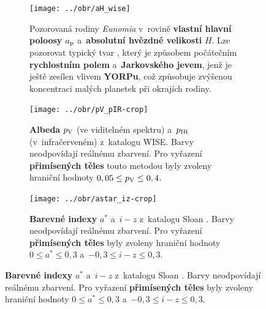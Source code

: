 \documentclass{beamer}
\newlength{\vyska}
\newlength{\vyskaB}
\newlength{\main}
\begin{document}
\begin{frame}
\begin{columns}[t]
\begin{column}{\main}
\begin{tcolorbox}[title=Výsledky\phantom{Úy},height=\vyskaB]
\begin{figure}[!htb]
\begin{subfigure}[b]{0.3\textwidth}
\label{fig:ae_ai_wise}
		\end{subfigure}
		\begin{subfigure}[b]{0.26\textwidth}
			\centering
			\texttt{[image: ../obr/aH\_wise]}
			\caption{Pozorovaná rodiny \textit{Eunomia} v~rovině \textbf{vlastní hlavní poloosy} $a_{\rm p}$ a~\textbf{absolutní hvězdné velikosti} $H$. Lze pozorovat typický tvar , který je způsobem počátečním \textbf{rychlostním polem} a~\textbf{Jarkovského jevem}, jenž je ještě zesílen vlivem \textbf{YORPu}, což způsobuje zvýšenou koncentraci malých planetek při okrajích rodiny.}
		\end{subfigure}
		\begin{subfigure}[b]{0.2\textwidth}
			\centering
			\texttt{[image: ../obr/pV\_pIR-crop]}
			\caption{\textbf{Albeda} $p_{\rm V}$ (ve viditelném spektru) a~$p_{\rm IR}$ (v~infračerveném) z~katalogu WISE. Barvy neodpovídají reálnému zbarvení. Pro vyřazení \textbf{přimísených těles} touto metodou byly zvoleny hraniční hodnoty $0,05 \leq p_{\rm V} \leq 0,4$.}
		\end{subfigure}
		\begin{subfigure}[b]{0.2\textwidth}
			\centering
			\texttt{[image: ../obr/astar\_iz-crop]}
			\caption{\textbf{Barevné indexy} $a^*$ a~$i-z$ z~katalogu Sloan \cite{ivezic01}. Barvy neodpovídají reálnému zbarvení. Pro vyřazení \textbf{přimísených těles} byly zvoleny hraniční hodnoty $0\leq a^* \leq 0,3$ a~$-0,3\leq i-z \leq 0,3$.
}
		\end{subfigure}
	\end{figure}

\


\end{tcolorbox}
\end{column}
\end{columns}
\end{frame}
\end{document}
